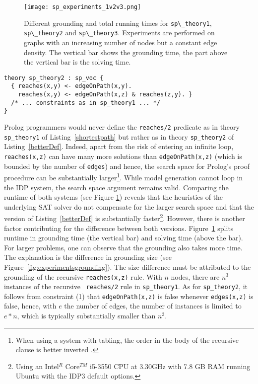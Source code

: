 \documentclass{tlp}
\newcommand{\idp}{{\sc IDP}\xspace}
\newcommand{\idpdrie}{{\sc IDP3}\xspace}
\renewcommand{\|}{\ensuremath{\,|\,}}
\newcommand{\listingref}[1]{Listing~\ref{#1}}
\renewcommand{\|}{\,|\,}
\newcommand{\idpcode}[1]{\lstinline{#1}}
\begin{document}
\begin{figure}[t]
  \centering
\texttt{[image: sp\_experiments\_1v2v3.png]}

  \caption{Different grounding and total running times for
    \idpcode{sp\_theory1}, \idpcode{sp\_theory2} and
    \idpcode{sp\_theory3}. Experiments are performed on graphs with an
    increasing number of nodes but a constant edge density. The
    vertical bar shows the grounding time, the part above the vertical
    bar is the solving time.}
  \label{fig:experiments1}
\end{figure}


\begin{lstlisting}[caption={Another definition for {\tt reaches}.},label={betterDef}]
theory sp_theory2 : sp_voc {
  { reaches(x,y) <- edgeOnPath(x,y).
    reaches(x,y) <- edgeOnPath(x,z) & reaches(z,y). }
  /* ... constraints as in sp_theory1 ... */
}
\end{lstlisting}


Prolog programmers would never define the {\tt reaches/2} predicate as
in theory {\tt sp\_theory1} of \listingref{shortestpath} but rather as
in theory {\tt sp\_theory2} of \listingref{betterDef}. Indeed, apart
from the risk of entering an infinite loop, {\tt reaches(x,z)} can
have many more solutions than {\tt edgeOnPath(x,z)} (which is bounded
by the number of {\tt edges}) and hence, the search space for Prolog's
proof procedure can be substantially larger\footnote{When using a
  system with tabling, the order in the body of the recursive clause
  is better inverted \cite{tplp/SwiftW12}.}. While model generation
cannot loop in the \idp system, the search space argument remains
valid. Comparing the runtime of both systems (see Figure
\ref{fig:experiments1}) reveals that the heuristics of the underlying
SAT solver do not compensate for the larger search space and that the
version of \listingref{betterDef} is substantially
faster\footnote{Using an Intel$^R$ Core$^{TM}$ i5-3550 CPU at 3.30GHz
  with 7.8 GB RAM running Ubuntu with the \idpdrie default
  options.}. However, there is another factor contributing for the
difference between both versions. Figure~\ref{fig:experiments1} splits
runtime in grounding time (the vertical bar) and solving time (above
the bar). For larger problems, one can observe that the grounding also
takes more time. The explanation is the difference in grounding size
(see Figure~\ref{fig:experimentsgrounding}). The size difference must
be attributed to the grounding of the recursive {\tt reaches(x,z)}
rule.  With $n$ nodes, there are $n^3$ instances of the recursive {\tt
  reaches/2} rule in {\tt sp\_theory1}. As for {\tt sp\_theory2}, it
follows from constraint (1) that {\tt edgeOnPath(x,z)} is false
whenever {\tt edges(x,z)} is false, hence, with $e$ the
number of edges, the number of instances is
limited to $e * n$, which is typically substantially smaller than
$n^3$.
\end{document}
